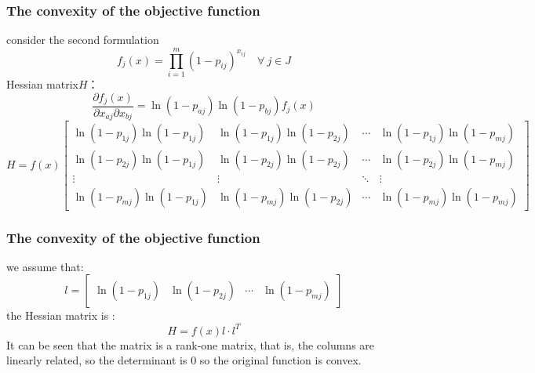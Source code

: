 \documentclass[CJK,10pt]{beamer}
\begin{document}
\begin{frame}
    \frametitle{The convexity of the objective function}
    consider the second formulation
    \begin{equation*}
        f_j(x) =  \prod_{i=1}^m (1 -  p_{ij})^{x_{ij}}\quad \forall~  j \in J
    \end{equation*}
    Hessian matrix$H$：
    \begin{equation*}
        \frac{\partial f_j(x)}{\partial x_{aj} \partial x_{bj}} = \ln(1 - p_{aj}) \ln(1 - p_{bj}) f_j(x)
    \end{equation*}
    {
    \scriptsize
    \begin{equation*}
        H = f(x)\begin{bmatrix}
            \ln(1 - p_{1j}) \ln(1 - p_{1j}) & \ln(1 - p_{1j}) \ln(1 - p_{2j}) &\cdots & \ln(1 - p_{1j}) \ln(1 - p_{mj}) \\
            \ln(1 - p_{2j}) \ln(1 - p_{1j}) & \ln(1 - p_{2j}) \ln(1 - p_{2j}) &\cdots & \ln(1 - p_{2j}) \ln(1 - p_{mj}) \\
            \vdots & \vdots &\ddots &\vdots \\
            \ln(1 - p_{mj}) \ln(1 - p_{1j}) & \ln(1 - p_{mj}) \ln(1 - p_{2j}) &\cdots & \ln(1 - p_{mj}) \ln(1 - p_{mj})


        \end{bmatrix}
    \end{equation*}
    }
\end{frame}

\begin{frame}
    \frametitle{The convexity of the objective function}
    we assume that:
    \begin{equation*}
        l = \begin{bmatrix}
            \ln(1 - p_{1j}) & \ln(1 - p_{2j}) & \cdots & \ln(1 - p_{mj})
        \end{bmatrix}
    \end{equation*}
    the Hessian matrix is :
    \begin{equation*}
        H = f(x)l\cdot l^T
    \end{equation*}
    It can be seen that the matrix is a rank-one matrix, that is, the columns are linearly related, so the determinant is 0 so the original function is convex.
\end{frame}
\end{document}
